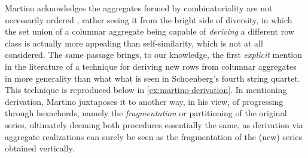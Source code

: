 Martino acknowledges the aggregates formed by combinatoriality are not necessarily ordered \cite[228]{Martino1961}, rather seeing it from the bright side of diversity, in which the set union of a columnar aggregate being capable of \emph{deriving} a different row class is actually more appealing than self-similarity, which is not at all considered. The same passage brings, to our knowledge, the first \emph{explicit} mention in the literature of a technique for deriving new rows from columnar aggregates in more generality than what what is seen in Schoenberg's fourth string quartet. This technique is reproduced below in \ref{ex:martino-derivation}. In mentioning derivation, Martino juxtaposes it to another way, in his view, of progressing through hexachords, namely the \emph{fragmentation} or partitioning of the original series, ultimately deeming both procedures essentially the same, as derivation via aggregate realizations can surely be seen as the fragmentation of the (new) series obtained vertically.


